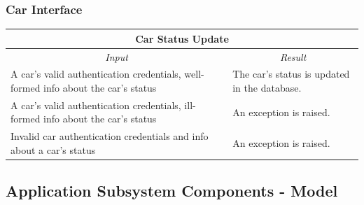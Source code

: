 \documentclass[english]{article}
\begin{document}
\subsubsection{Car Interface}
\begin{center}
	\begin{tabular}{ | p{6cm} | p{6cm} | }
		\hline 
		\multicolumn{2}{|c|}{\textbf{Car Status Update}} \\
		\hline
		\multicolumn{1}{|c|}{\textit{Input}} & \multicolumn{1}{c|}{\textit{Result}} \\
		\hline
		A car's valid authentication credentials, well-formed info about the car's status & The car's status is updated in the database. \\
		\hline
		A car's valid authentication credentials, ill-formed info about the car's status & An exception is raised. \\
		\hline
		Invalid car authentication credentials and info about a car's status  & An exception is raised. \\
		\hline
	\end{tabular}
\end{center}

\subsection{Application Subsystem Components - Model}
\label{subsec:appcomp}
\end{document}
